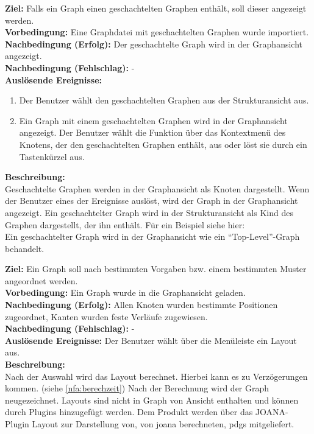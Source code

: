 \label{fa:hierarchgraph}
\textbf{Ziel:} Falls ein Graph einen geschachtelten Graphen enthält, soll dieser angezeigt werden.\\
\textbf{Vorbedingung:} Eine Graphdatei mit geschachtelten Graphen wurde importiert.\\
\textbf{Nachbedingung (Erfolg):} Der geschachtelte Graph wird in der Graphansicht angezeigt.\\
\textbf{Nachbedingung (Fehlschlag):} -\\
\textbf{Auslösende Ereignisse:}
\begin{enumerate}[nolistsep, label=(\alph*)]
  \item Der Benutzer wählt den geschachtelten Graphen aus der Strukturansicht aus.
  \item Ein Graph mit einem geschachtelten Graphen wird in der Graphansicht angezeigt.
  Der Benutzer wählt die Funktion über das Kontextmenü des Knotens, der den geschachtelten Graphen enthält, aus oder löst sie durch ein Tastenkürzel aus.
\end{enumerate}
\textbf{Beschreibung:}\\
Geschachtelte Graphen werden in der Graphansicht als Knoten dargestellt.
Wenn der Benutzer eines der Ereignisse auslöst, wird der Graph in der Graphansicht angezeigt.
Ein geschachtelter Graph wird in der Strukturansicht als Kind des Graphen dargestellt, der ihn enthält. Für ein Beispiel siehe hier:\\ %
Ein geschachtelter Graph wird in der Graphansicht wie ein ``Top-Level''-Graph behandelt. %


\label{fa:layout}
\textbf{Ziel:} Ein Graph soll nach bestimmten Vorgaben bzw. einem bestimmten Muster angeordnet werden.\\
\textbf{Vorbedingung:} Ein Graph wurde in die Graphansicht geladen.\\
\textbf{Nachbedingung (Erfolg):} Allen Knoten wurden bestimmte Positionen zugeordnet, Kanten wurden feste Verläufe zugewiesen.\\
\textbf{Nachbedingung (Fehlschlag):} -\\
\textbf{Auslösende Ereignisse:}
Der Benutzer wählt über die Menüleiste ein Layout aus.\\
\textbf{Beschreibung:}\\
Nach der Auswahl wird das Layout berechnet. Hierbei kann es zu Verzögerungen kommen. (siehe \ref{nfa:berechzeit})
Nach der Berechnung wird der Graph neugezeichnet. Layouts sind nicht in Graph von Ansicht enthalten und können durch Plugins hinzugefügt werden.
Dem Produkt werden über das JOANA-Plugin Layout zur Darstellung von, von \gls{joana} berechneten, \glspl{pdg} mitgeliefert.


